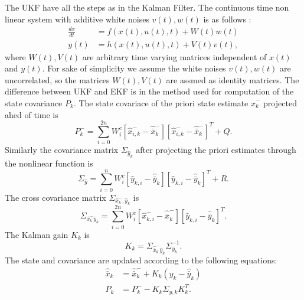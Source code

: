 The UKF have all the steps as in the Kalman Filter. The continuous time non linear system with additive white noises $v(t),w(t)$ is as follows \citep{sim07}:
\begin{equation}
    \label{eq:ukf_nlsys}
    \begin{split}
       \frac{dx}{dt} &= f(x(t),u(t),t) + W(t)w(t) \\
       y(t) &= h(x(t),u(t),t) + V(t)v(t),
    \end{split}
\end{equation} 
where $W(t),V(t)$ are arbitrary time varying matrices independent of $x(t)$ and $y(t)$. For sake of simplicity we assume the white noises $v(t),w(t)$  are uncorrelated, so the matrices $W(t),V(t)$ are assmed as identity matrices. The difference between UKF and EKF is in the method used for computation of the state covariance $P_k$. The state covariace of the priori state estimate $\hat x_k^-$ projected ahed of time is $$ P_k^- = \sum \limits_{i=0}^{2n} W_i^c [\hat x_{i,k}^- - \hat{\bar x}_k^-] [\hat x_{i,k}^- - \hat{\bar x}_k^-]^T + Q. $$
Similarly the covariance matrix $\Sigma_{\hat y_k}$ after projecting the priori estimates through the nonlinear function is $$ \Sigma_{\hat y} = \sum \limits_{i=0}^n W_i^c [\hat{y}_{k,i} - \hat{\bar y}_k ] [ \hat{y}_{k,i} - \hat{\bar y}_k] ^T+R.$$
The cross covariance matrix $\Sigma_{\hat x_k^-, \hat y_k}$ is $$ \Sigma_{\hat x_k^- \hat y_k} = \sum \limits_{i=0}^{2n} W_i^c [\hat x_{k,i}^- - \hat{\bar x}_k^- ] [ \hat y_{k,i} - \hat{\bar y}_k] ^T .$$
The Kalman gain $K_k$ is $$K_k = \Sigma_{\hat{\bar x}_k^- \hat y_k} \Sigma_{\hat y_k}^{-1}.$$
The state and covariance are updated according to the following equations:
$$  \begin{aligned}
    \hat{\bar{x}}_k &= \hat{\bar{x}}_k^- + K_k(y_k - \hat{\bar y}_k)\\
    P_k &= P_k^- - K_k \Sigma_{y,k} K_k^T.
    \end{aligned}
    $$
